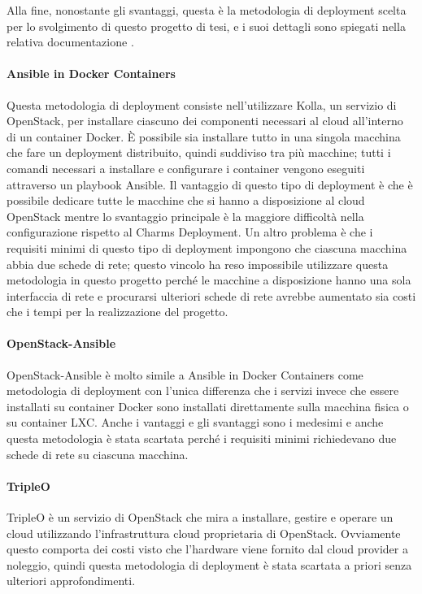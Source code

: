 \noindent
Alla fine, nonostante gli svantaggi, questa è la metodologia di deployment scelta per lo svolgimento di questo progetto di tesi, e i suoi dettagli sono spiegati nella relativa documentazione \cite{openstack_charm_deployment_yoga}.


\paragraph{Ansible in Docker Containers} Questa metodologia di deployment consiste nell'utilizzare Kolla, un servizio di OpenStack, per installare ciascuno dei componenti necessari al cloud all'interno di un container Docker. È possibile sia installare tutto in una singola macchina che fare un deployment distribuito, quindi suddiviso tra più macchine; tutti i comandi necessari a installare e configurare i container vengono eseguiti attraverso un playbook Ansible. Il vantaggio di questo tipo di deployment è che è possibile dedicare tutte le macchine che si hanno a disposizione al cloud OpenStack mentre lo svantaggio principale è la maggiore difficoltà nella configurazione rispetto al Charms Deployment.
Un altro problema è che i requisiti minimi di questo tipo di deployment impongono che ciascuna macchina abbia due schede di rete; questo vincolo ha reso impossibile utilizzare questa metodologia in questo progetto perché le macchine a disposizione hanno una sola interfaccia di rete e procurarsi ulteriori schede di rete avrebbe aumentato sia costi che i tempi per la realizzazione del progetto.

\paragraph{OpenStack-Ansible} OpenStack-Ansible è molto simile a Ansible in Docker Containers come metodologia di deployment con l'unica differenza che i servizi invece che essere installati su container Docker sono installati direttamente sulla macchina fisica o su container LXC. Anche i vantaggi e gli svantaggi sono i medesimi e anche questa metodologia è stata scartata perché i requisiti minimi richiedevano due schede di rete su ciascuna macchina.

\paragraph{TripleO} TripleO è un servizio di OpenStack che mira a installare, gestire e operare un cloud utilizzando l'infrastruttura cloud proprietaria di OpenStack. 
% 
Ovviamente questo comporta dei costi visto che l'hardware viene fornito dal cloud provider a noleggio, quindi questa metodologia di deployment è stata scartata a priori senza ulteriori approfondimenti.

